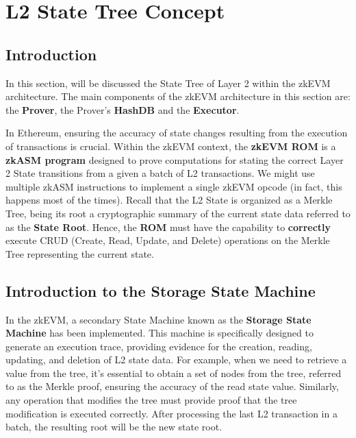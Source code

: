 





\section{L2 State Tree Concept}




\subsection{Introduction}

In this section, will be discussed the State Tree of Layer 2 within the zkEVM architecture. The main components of the zkEVM architecture in this section are: the \textbf{Prover}, the Prover's \textbf{HashDB} and the \textbf{Executor}.

In Ethereum, ensuring the accuracy of state changes resulting from the execution of transactions is crucial. Within the zkEVM context, the \textbf{zkEVM ROM} is a \textbf{zkASM program} designed to prove computations for stating the correct Layer 2 State transitions from a given a batch of L2 transactions. We might use multiple zkASM instructions to implement a single zkEVM opcode (in fact, this happens most of the times). Recall that the L2 State is organized as a Merkle Tree, being its root a cryptographic summary of the current state data referred to as the \textbf{State Root}. Hence, the \textbf{ROM} must have the capability to \textbf{correctly} execute CRUD (Create, Read, Update, and Delete) operations on the Merkle Tree representing the current state.



\subsection{Introduction to the Storage State Machine}

In the zkEVM, a secondary State Machine known as the \textbf{Storage State Machine} has been implemented. This machine is specifically designed to generate an execution trace, providing evidence for the creation, reading, updating, and deletion of L2 state data. For example, when we need to retrieve a value from the tree, it's essential to obtain a set of nodes from the tree, referred to as the Merkle proof, ensuring the accuracy of the read state value. Similarly, any operation that modifies the tree must provide proof that the tree modification is executed correctly. After processing the last L2 transaction in a batch, the resulting root will be the new state root.


